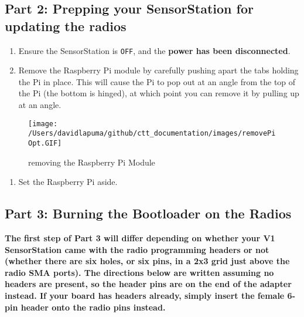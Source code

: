 \documentclass[
]{article}
\providecommand{\tightlist}{%
  \setlength{\itemsep}{0pt}\setlength{\parskip}{0pt}}
\begin{document}
\hypertarget{part-2-prepping-your-sensorstation-for-updating-the-radios}{%
\subsection{Part 2: Prepping your SensorStation for updating the
radios}\label{part-2-prepping-your-sensorstation-for-updating-the-radios}}

\begin{enumerate}
\def\labelenumi{\arabic{enumi}.}
\tightlist
\item
  Ensure the SensorStation is \texttt{OFF}, and the \textbf{power has
  been disconnected}.
\item
  Remove the Raspberry Pi module by carefully pushing apart the tabs
  holding the Pi in place. This will cause the Pi to pop out at an angle
  from the top of the Pi (the bottom is hinged), at which point you can
  remove it by pulling up at an angle.
\end{enumerate}

\begin{figure}
\hypertarget{id}{%
\centering
\texttt{[image: /Users/davidlapuma/github/ctt\_documentation/images/removePiOpt.GIF]}
\caption{removing the Raspberry Pi Module}\label{id}
}
\end{figure}

\begin{enumerate}
\def\labelenumi{\arabic{enumi}.}
\setcounter{enumi}{2}
\tightlist
\item
  Set the Raspberry Pi aside.
\end{enumerate}

\hypertarget{part-3-burning-the-bootloader-on-the-radios}{%
\subsection{Part 3: Burning the Bootloader on the
Radios}\label{part-3-burning-the-bootloader-on-the-radios}}

\textbf{The first step of Part 3 will differ depending on whether your
V1 SensorStation came with the radio programming headers or not (whether
there are six holes, or six pins, in a 2x3 grid just above the radio SMA
ports). The directions below are written assuming no headers are
present, so the header pins are on the end of the adapter instead. If
your board has headers already, simply insert the female 6-pin header
onto the radio pins instead.}
\end{document}

